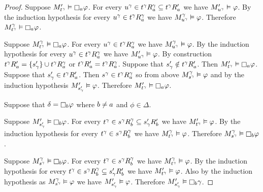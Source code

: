 \begin{proof}
Suppose $\kPModelP{\kStateT[\gamma]} \entails \necessaryA \phi$.
For every $\kStateU[\gamma] \in \kSuccessorsA[\gamma]{\kStateT[\gamma]} \subseteq \kSuccessorsPA{\kStateT[\gamma]}$ we have $\kPModelP{\kStateU[\gamma]} \entails \phi$.
By the induction hypothesis for every $\kStateU[\gamma] \in \kSuccessorsA[\gamma]{\kStateT[\gamma]}$ we have $\kPModel[\gamma]{\kStateU[\gamma]} \entails \phi$.
Therefore $\kPModel[\gamma]{\kStateT[\gamma]} \entails \necessaryA \phi$.

Suppose $\kPModel[\gamma]{\kStateT[\gamma]} \entails \necessaryA \phi$.
For every $\kStateU[\gamma] \in \kSuccessorsA[\gamma]{\kStateT[\gamma]}$ we have $\kPModel[\gamma]{\kStateU[\gamma]} \entails \phi$.
By the induction hypothesis for every $\kStateU[\gamma] \in \kSuccessorsA[\gamma]{\kStateT[\gamma]}$ we have $\kPModelP{\kStateU[\gamma]} \entails \phi$.
By construction $\kSuccessorsPA{\kStateT[\gamma]} = \{\kStateSP_\gamma\} \cup \kSuccessorsA[\gamma]{\kStateT[\gamma]}$ or $\kSuccessorsPA{\kStateT[\gamma]} = \kSuccessorsA[\gamma]{\kStateT[\gamma]}$.
Suppose that $\kStateSP_\gamma \notin \kSuccessorsPA{\kStateT[\gamma]}$.
Then $\kPModelP{\kStateT[\gamma]} \entails \necessaryA \phi$.
Suppose that $\kStateSP_\gamma \in \kSuccessorsPA{\kStateT[\gamma]}$.
Then $\kStateS[\gamma] \in \kSuccessorsA[\gamma]{\kStateT[\gamma]}$ so from above $\kPModel[\gamma]{\kStateS[\gamma]} \entails \phi$ and by the induction hypothesis $\kPModelP{\kStateSP_\gamma} \entails \phi$.
Therefore $\kPModelP{\kStateT[\gamma]} \entails \necessaryA \phi$.

Suppose that $\delta = \necessaryB \phi$ where $\agentB \neq \agentA$ and $\phi \in \Delta$.

Suppose $\kPModelP{\kStateSP_\gamma} \entails \necessaryB \phi$.
For every $\kStateT[\gamma] \in \kSuccessorsB[\gamma]{\kStateS[\gamma]} \subseteq \kSuccessorsPB{\kStateSP_\gamma}$ we have $\kPModelP{\kStateT[\gamma]} \entails \phi$.
By the induction hypothesis for every $\kStateT[\gamma] \in \kSuccessorsB[\gamma]{\kStateS[\gamma]}$ we have $\kPModel[\gamma]{\kStateT[\gamma]} \entails \phi$.
Therefore $\kPModel[\gamma]{\kStateS[\gamma]} \entails \necessaryB \phi$.

Suppose $\kPModel[\gamma]{\kStateS[\gamma]} \entails \necessaryB \phi$.
For every $\kStateT[\gamma] \in \kSuccessorsB[\gamma]{\kStateS[\gamma]}$ we have $\kPModel[\gamma]{\kStateT[\gamma]} \entails \phi$.
By the induction hypothesis for every $\kStateT[\gamma] \in \kSuccessorsB[\gamma]{\kStateS[\gamma]} \subseteq \kSuccessorsPB{\kStateSP_\gamma}$ we have $\kPModelP{\kStateT[\gamma]} \entails \phi$.
Also by the induction hypothesis as $\kPModel[\gamma]{\kStateS[\gamma]} \entails \phi$ we have $\kPModelP{\kStateSP_\gamma} \entails \phi$.
Therefore $\kPModelP{\kStateSP_\gamma} \entails \necessaryB \gamma$.


\end{proof}
